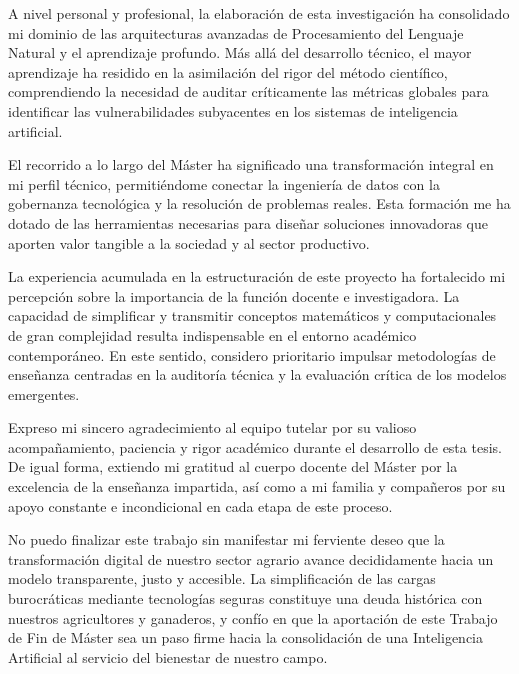 A nivel personal y profesional, la elaboración de esta investigación ha consolidado mi dominio de las arquitecturas avanzadas de Procesamiento del Lenguaje Natural y el aprendizaje profundo. Más allá del desarrollo técnico, el mayor aprendizaje ha residido en la asimilación del rigor del método científico, comprendiendo la necesidad de auditar críticamente las métricas globales para identificar las vulnerabilidades subyacentes en los sistemas de inteligencia artificial.

El recorrido a lo largo del Máster ha significado una transformación integral en mi perfil técnico, permitiéndome conectar la ingeniería de datos con la gobernanza tecnológica y la resolución de problemas reales. Esta formación me ha dotado de las herramientas necesarias para diseñar soluciones innovadoras que aporten valor tangible a la sociedad y al sector productivo.

La experiencia acumulada en la estructuración de este proyecto ha fortalecido mi percepción sobre la importancia de la función docente e investigadora. La capacidad de simplificar y transmitir conceptos matemáticos y computacionales de gran complejidad resulta indispensable en el entorno académico contemporáneo. En este sentido, considero prioritario impulsar metodologías de enseñanza centradas en la auditoría técnica y la evaluación crítica de los modelos emergentes.

Expreso mi sincero agradecimiento al equipo tutelar por su valioso acompañamiento, paciencia y rigor académico durante el desarrollo de esta tesis. De igual forma, extiendo mi gratitud al cuerpo docente del Máster por la excelencia de la enseñanza impartida, así como a mi familia y compañeros por su apoyo constante e incondicional en cada etapa de este proceso.

No puedo finalizar este trabajo sin manifestar mi ferviente deseo que la transformación digital de nuestro sector agrario avance decididamente hacia un modelo transparente, justo y accesible. La simplificación de las cargas burocráticas mediante tecnologías seguras constituye una deuda histórica con nuestros agricultores y ganaderos, y confío en que la aportación de este Trabajo de Fin de Máster sea un paso firme hacia la consolidación de una Inteligencia Artificial al servicio del bienestar de nuestro campo.



